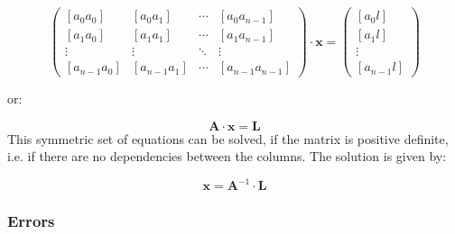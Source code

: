 \begin{equation}
	\left( \begin{array}{cccc}
	\left[ a_{0}a_{0}\right] & \left[ a_{0}a_{1}\right] &
		 \cdots & \left[ a_{0}a_{n-1}\right] \\
	\left[ a_{1}a_{0}\right] & \left[ a_{1}a_{1}\right] &
		\cdots & \left[ a_{1}a_{n-1}\right] \\
	\vdots       & \vdots       & \ddots & \vdots \\
	\left[ a_{n-1}a_{0}\right] & \left[ a_{n-1}a_{1}\right] &
		\cdots & \left[ a_{n-1}a_{n-1}\right]
	       \end{array} \right)
	\cdot \mathbf{x} =
	\left( \begin{array} {c}
	\left[ a_{0}l\right] \\
	\left[ a_{1}l\right] \\
	\vdots \\
	\left[ a_{n-1}l\right]
	       \end{array} \right)
			\label{.e.solr}
\end{equation}

or:

\begin{equation}
	\mathbf{A}\cdot\mathbf{x} = \mathbf{L}
\end{equation}
This symmetric set of equations can be solved, if the matrix is positive
definite, i.e. if there are no dependencies between the columns. The solution
is given by:

\begin{equation}
	\mathbf{x} = \mathbf{A}^{-1}\cdot\mathbf{L}
\end{equation}

\subsubsection{Errors}
\label{.ss.errors}

